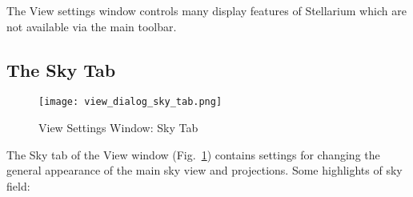 The View settings window controls many display features of Stellarium
which are not available via the main toolbar.

\subsection{The Sky Tab}
\label{sec:gui:view:sky}

\begin{figure}[htbp]
\centering\texttt{[image: view\_dialog\_sky\_tab.png]}
\caption{View Settings Window: Sky Tab}
\label{fig:gui:view:sky}
\end{figure}

The Sky tab of the View window (Fig.~\ref{fig:gui:view:sky}) contains settings
for changing the general appearance of the main sky view and projections. Some highlights of sky field:

